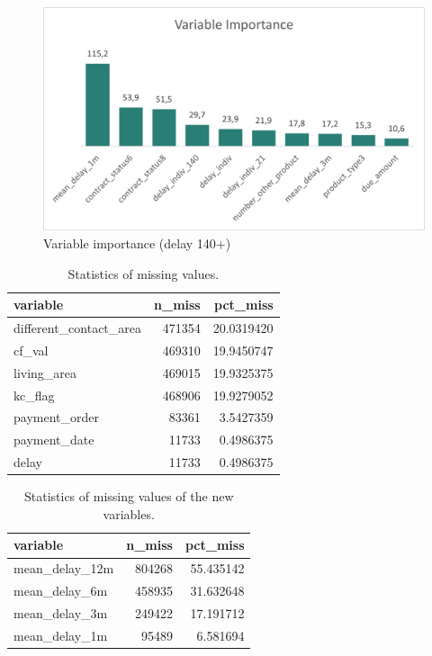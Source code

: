 \documentclass[
]{article}
\begin{document}
\begin{figure}
\includegraphics[width=0.9\linewidth]{varimp140} \caption{\label{fig:varIm21}Variable importance (delay 140+)}\label{fig:varIm140}
\end{figure}

\begin{table}

\caption{\label{tab:Missing-stat}Statistics of missing values.}
\centering
\begin{tabular}[t]{l|r|r}
\hline
variable & n\_miss & pct\_miss\\
\hline
different\_contact\_area & 471354 & 20.0319420\\
\hline
cf\_val & 469310 & 19.9450747\\
\hline
living\_area & 469015 & 19.9325375\\
\hline
kc\_flag & 468906 & 19.9279052\\
\hline
payment\_order & 83361 & 3.5427359\\
\hline
payment\_date & 11733 & 0.4986375\\
\hline
delay & 11733 & 0.4986375\\
\hline
\end{tabular}
\end{table}

\begin{table}

\caption{\label{tab:miss-statnew}Statistics of missing values of the new variables.}
\centering
\begin{tabular}[t]{l|r|r}
\hline
variable & n\_miss & pct\_miss\\
\hline
mean\_delay\_12m & 804268 & 55.435142\\
\hline
mean\_delay\_6m & 458935 & 31.632648\\
\hline
mean\_delay\_3m & 249422 & 17.191712\\
\hline
mean\_delay\_1m & 95489 & 6.581694\\
\hline
\end{tabular}
\end{table}
\end{document}
